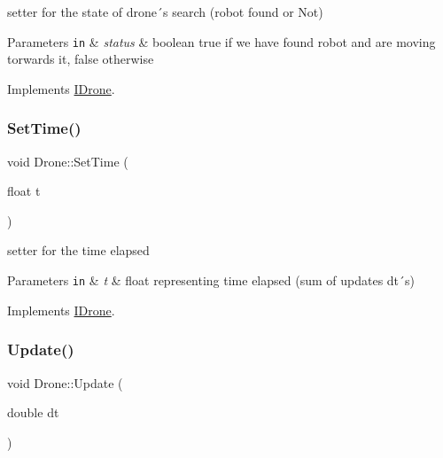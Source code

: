 setter for the state of drone´s search (robot found or Not) 


\begin{DoxyParams}[1]{Parameters}
\mbox{\tt in}  & {\em status} & boolean true if we have found robot and are moving torwards it, false otherwise \\
\hline
\end{DoxyParams}


Implements \hyperlink{classIDrone_ac6f580814e7091ea64ecf2a7137b8120}{I\+Drone}.

\mbox{\label{classDrone_a3c8e1ccbff90c7b5192679317f219061}} 
\subsubsection{\texorpdfstring{Set\+Time()}{SetTime()}}
{\footnotesize\ttfamily void Drone\+::\+Set\+Time (\begin{DoxyParamCaption}\item[{float}]{t }\end{DoxyParamCaption})\hspace{0.3cm}{\ttfamily [virtual]}}



setter for the time elapsed 


\begin{DoxyParams}[1]{Parameters}
\mbox{\tt in}  & {\em t} & float representing time elapsed (sum of updates dt´s) \\
\hline
\end{DoxyParams}


Implements \hyperlink{classIDrone_a0ca36885fd79fbf2efa3909771218d56}{I\+Drone}.

\mbox{\label{classDrone_abc6b79ccc7fdbc3bec8d539fc836c04d}} 
\subsubsection{\texorpdfstring{Update()}{Update()}}
{\footnotesize\ttfamily void Drone\+::\+Update (\begin{DoxyParamCaption}\item[{double}]{dt }\end{DoxyParamCaption})\hspace{0.3cm}{\ttfamily [virtual]}}



